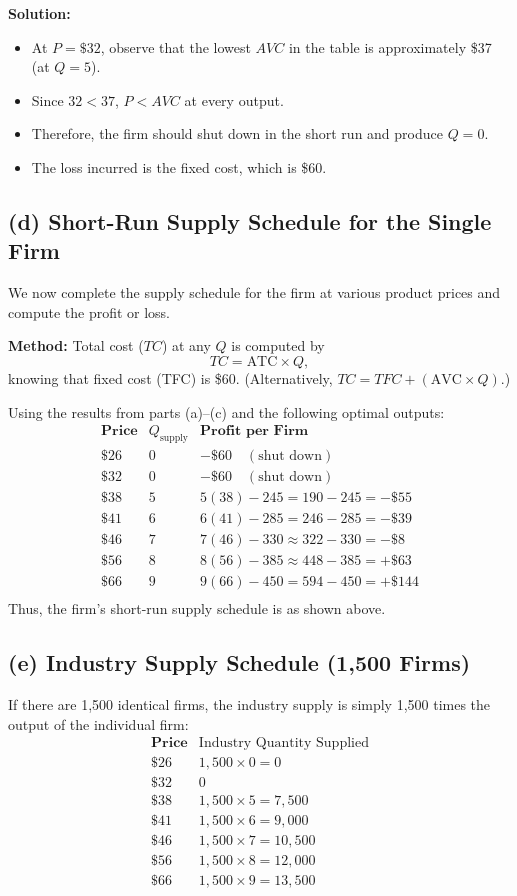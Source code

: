 \documentclass[12pt]{article}
\begin{document}
\textbf{Solution:}
\begin{itemize}[noitemsep]
  \item At \(P = \$32\), observe that the lowest \(AVC\) in the table is approximately \$37 (at \(Q=5\)).
  \item Since \(32 < 37\), \(P < AVC\) at every output.
  \item Therefore, the firm should shut down in the short run and produce \(Q=0\).
  \item The loss incurred is the fixed cost, which is \$60.
\end{itemize}

\subsection*{(d) Short-Run Supply Schedule for the Single Firm}
We now complete the supply schedule for the firm at various product prices and compute the profit or loss.

\textbf{Method:} Total cost (\(TC\)) at any \(Q\) is computed by
\[
TC = \text{ATC} \times Q,
\]
knowing that fixed cost (TFC) is \$60. (Alternatively, \(TC = TFC + (\text{AVC} \times Q)\).)

Using the results from parts (a)–(c) and the following optimal outputs:
\[
\begin{array}{c|c|c}
\textbf{Price} & Q_{\text{supply}} & \textbf{Profit per Firm} \\
\hline
\$26 & 0 & -\$60 \quad (\text{shut down}) \\
\$32 & 0 & -\$60 \quad (\text{shut down}) \\
\$38 & 5 & 5(38) - 245 = 190 - 245 = -\$55 \\
\$41 & 6 & 6(41) - 285 = 246 - 285 = -\$39 \\
\$46 & 7 & 7(46) - 330 \approx 322 - 330 = -\$8 \\
\$56 & 8 & 8(56) - 385 \approx 448 - 385 = +\$63 \\
\$66 & 9 & 9(66) - 450 = 594 - 450 = +\$144 \\
\end{array}
\]
Thus, the firm’s short-run supply schedule is as shown above.

\subsection*{(e) Industry Supply Schedule (1,500 Firms)}
If there are 1,500 identical firms, the industry supply is simply 1,500 times the output of the individual firm:
\[
\begin{array}{c|c}
\textbf{Price} & \text{Industry Quantity Supplied} \\
\hline
\$26 & 1,500 \times 0 = 0 \\
\$32 & 0 \\
\$38 & 1,500 \times 5 = 7,500 \\
\$41 & 1,500 \times 6 = 9,000 \\
\$46 & 1,500 \times 7 = 10,500 \\
\$56 & 1,500 \times 8 = 12,000 \\
\$66 & 1,500 \times 9 = 13,500 \\
\end{array}
\]
\end{document}
